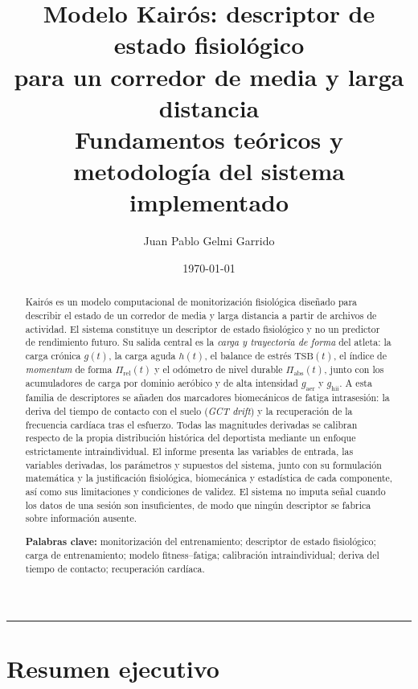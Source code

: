 \documentclass[11pt,a4paper]{article}
\title{\vspace{-1.2cm}\bfseries\color{black}
Modelo Kairós: descriptor de estado fisiológico\\ para un corredor de media y larga distancia\\[4pt]
\large\normalfont\color{black}
Fundamentos teóricos y\\ metodología del sistema implementado}
\author{Juan Pablo Gelmi Garrido}
\date{\today}
\begin{document}
\maketitle
\thispagestyle{fancy}

\begin{abstract}
\noindent
Kairós es un modelo computacional de monitorización fisiológica diseñado para describir el estado de un corredor de media y larga distancia a partir de archivos de actividad. El sistema constituye un descriptor de estado fisiológico y no un predictor de rendimiento futuro. Su salida central es la \emph{carga y trayectoria de forma} del atleta: la carga crónica $g(t)$, la carga aguda $h(t)$, el balance de estrés $\mathrm{TSB}(t)$, el índice de \emph{momentum} de forma $\Pi_{\mathrm{rel}}(t)$ y el odómetro de nivel durable $\Pi_{\mathrm{abs}}(t)$, junto con los acumuladores de carga por dominio aeróbico y de alta intensidad $g_{\mathrm{aer}}$ y $g_{\mathrm{hii}}$. A esta familia de descriptores se añaden dos marcadores biomecánicos de fatiga intrasesión: la deriva del tiempo de contacto con el suelo (\emph{GCT drift}) y la recuperación de la frecuencia cardíaca tras el esfuerzo. Todas las magnitudes derivadas se calibran respecto de la propia distribución histórica del deportista mediante un enfoque estrictamente intraindividual. El informe presenta las variables de entrada, las variables derivadas, los parámetros y supuestos del sistema, junto con su formulación matemática y la justificación fisiológica, biomecánica y estadística de cada componente, así como sus limitaciones y condiciones de validez. El sistema no imputa señal cuando los datos de una sesión son insuficientes, de modo que ningún descriptor se fabrica sobre información ausente.

\vspace{4pt}
\noindent\textbf{Palabras clave:} monitorización del entrenamiento; descriptor de estado fisiológico; carga de entrenamiento; modelo fitness--fatiga; calibración intraindividual; deriva del tiempo de contacto; recuperación cardíaca.
\end{abstract}


\newpage
\tableofcontents
\vspace{0.4cm}
\hrule
\vspace{0.4cm}

\newpage
\section{Resumen ejecutivo}
\end{document}
